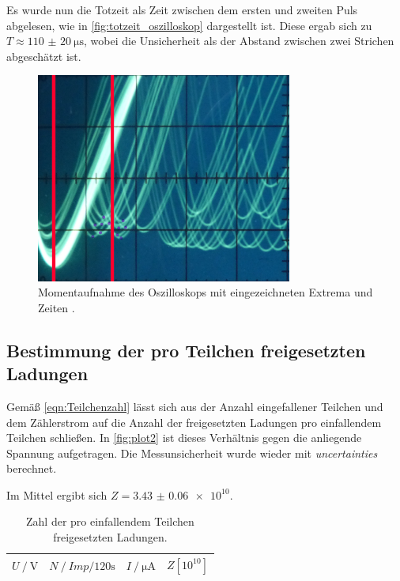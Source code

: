 Es wurde nun die Totzeit als Zeit zwischen dem ersten und zweiten Puls abgelesen,
wie in \autoref{fig:totzeit_oszilloskop} dargestellt ist.
Diese ergab sich zu $T \approx \SI{110(20)}{\micro\second}$,
wobei die Unsicherheit als der Abstand zwischen zwei Strichen abgeschätzt ist.

\begin{figure}[H]
  \centering
  \includegraphics[width=0.75\textwidth]{content/img/totzeit_oszilloskop.jpg}
  \caption{Momentaufnahme des Oszilloskops mit eingezeichneten Extrema und Zeiten \cite{oszilloskop}.}
  \label{fig:totzeit_oszilloskop}
\end{figure}

\subsection{Bestimmung der pro Teilchen freigesetzten Ladungen}

Gemäß \autoref{eqn:Teilchenzahl} lässt sich aus der Anzahl eingefallener Teilchen und dem Zählerstrom
auf die Anzahl der freigesetzten Ladungen pro einfallendem Teilchen schließen.
In \autoref{fig:plot2} ist dieses Verhältnis gegen die anliegende Spannung aufgetragen.
Die Messunsicherheit wurde wieder mit \textit{uncertainties} berechnet.

Im Mittel ergibt sich $Z=\num{3.43(6)e+10}$.

\begin{table}[H]
  \centering
  \caption{Zahl der pro einfallendem Teilchen freigesetzten Ladungen.}
  \begin{tabular}{c c c c}
  \toprule
  $U \mathbin{/} \si{\volt}$ &
  $N \mathbin{/} \si{{Imp} \per 120 \second}$ &
  $I \mathbin{/} \si{\micro\ampere}$ &
  $Z [10^{10}]$ \\
  \midrule
  
  \bottomrule
  \end{tabular}
\end{table}

